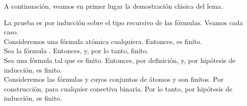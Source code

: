 \begin{isabellebody}
\begin{isamarkuptext}
  A continuación, veamos en primer lugar la demostración clásica del lema. 

 \begin{demostracion}
  La prueba es por inducción sobre el tipo recursivo de las fórmulas. Veamos cada caso.\\
  Consideremos una fórmula atómica  cualquiera. Entonces, 
   es finito.\\
  Sea la fórmula \isa{{\isasymbottom}}. Entonces,  y, por lo tanto, finito.\\
  Sea  una fórmula tal que  es finito. Entonces, por definición, 
   y, por hipótesis de inducción, es finito.\\
  Consideremos las fórmulas  y  cuyos conjuntos de átomos  y 
   son finitos. Por construcción,  
  para cualquier \isa{{\isacharasterisk}} conectiva binaria. Por lo tanto, por hipótesis de inducción, 
   es finito. 
 \end{demostracion} 


\end{isamarkuptext}
\end{isabellebody}
